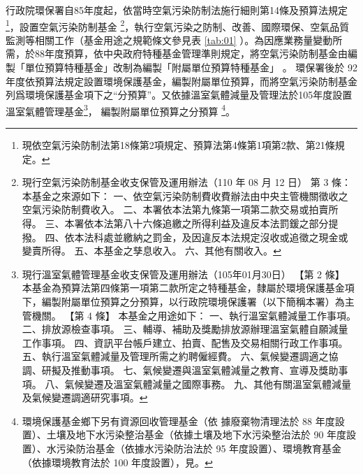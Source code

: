 \documentclass[12pt,a4paper]{article}
\begin{document}
行政院環保署自85年度起，依當時空氣污染防制法施行細則第14條及預算法規定\footnote{現依空氣污染防制法第18條第2項規定、預算法第4條第1項第2款、第21條規定。}，設置空氣污染防制基金
\footnote{
  現行空氣污染防制基金收支保管及運用辦法（110 年 08 月 12 日）
  第 3 條：
本基金之來源如下：
一、依空氣污染防制費收費辦法由中央主管機關徵收之空氣污染防制費收入。
二、本署依本法第九條第一項第二款交易或拍賣所得。
三、本署依本法第八十六條追繳之所得利益及違反本法罰鍰之部分提撥。
四、依本法科處並繳納之罰金，及因違反本法規定沒收或追徵之現金或變賣所得。
五、本基金之孳息收入。
六、其他有關收入。}，執行空氣污染之防制、改善、國際環保、空氣品質監測等相關工作（基金用途之規範條文參見表 \ref{tab:01} ）。為因應業務量變動所需，於88年度預算，依中央政府特種基金管理準則規定，將空氣污染防制基金由編製「單位預算特種基金」改制為編製「附屬單位預算特種基金」
。
環保署後於 92 年度依預算法規定設置環境保護基金，編製附屬單位預算，而將空氣污染防制基金列爲環境保護基金項下之“分預算”。又依據溫室氣體減量及管理法於105年度設置溫室氣體管理基金\footnote{現行溫室氣體管理基金收支保管及運用辦法（105年01月30日）
【第 2 條】
本基金為預算法第四條第一項第二款所定之特種基金，隸屬於環境保護基金項下，編製附屬單位預算之分預算，以行政院環境保護署（以下簡稱本署）為主管機關。
【第 4 條】
本基金之用途如下：
一、執行溫室氣體減量工作事項。
二、排放源檢查事項。
三、輔導、補助及獎勵排放源辦理溫室氣體自願減量工作事項。
四、資訊平台帳戶建立、拍賣、配售及交易相關行政工作事項。
五、執行溫室氣體減量及管理所需之約聘僱經費。
六、氣候變遷調適之協調、研擬及推動事項。
七、氣候變遷與溫室氣體減量之教育、宣導及獎助事項。
八、氣候變遷及溫室氣體減量之國際事務。
九、其他有關溫室氣體減量及氣候變遷調適研究事項。
}，
編製附屬單位預算之分預算
\footnote{環境保護基金鄉下另有資源回收管理基金（依
據廢棄物清理法於 88 年度設置）、土壤及地下水污染整治基金（依據土壤及地下水污染整治法於 90 年度設置）、水污染防治基金（依據水污染防治法於 95 年度設置）、環境教育基金（依據環境教育法於 100 年度設置），見。}。
\end{document}
